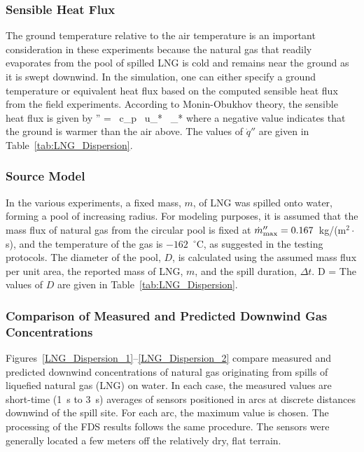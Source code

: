 \subsubsection{Sensible Heat Flux}

The ground temperature relative to the air temperature is an important consideration in these experiments because the natural gas that readily evaporates from the pool of spilled LNG is cold and remains near the ground as it is swept downwind. In the simulation, one can either specify a ground temperature or equivalent heat flux based on the computed sensible heat flux from the field experiments. According to Monin-Obukhov theory, the sensible heat flux is given by
\be
   '' = \rho \, c_p \, u_* \, \theta_*
\ee
where a negative value indicates that the ground is warmer than the air above. The values of $\dot{q}''$ are given in Table~\ref{tab:LNG_Dispersion}.

\subsubsection{Source Model}

In the various experiments, a fixed mass, $m$, of LNG was spilled onto water, forming a pool of increasing radius. For modeling purposes, it is assumed that the mass flux of natural gas from the circular pool is fixed at $\dot{m}''_{\rm max}=0.167$~kg/(m$^2 \cdot$s), and the temperature of the gas is $-162$~$^\circ$C, as suggested in the testing protocols. The diameter of the pool, $D$, is calculated using the assumed mass flux per unit area, the reported mass of LNG, $m$, and the spill duration, $\Delta t$.
\be
   D = 
\ee
The values of $D$ are given in Table~\ref{tab:LNG_Dispersion}.



\subsubsection{Comparison of Measured and Predicted Downwind Gas Concentrations}

Figures~\ref{LNG_Dispersion_1}--\ref{LNG_Dispersion_2} compare measured and predicted downwind concentrations of natural gas originating from spills of liquefied natural gas (LNG) on water. In each case, the measured values are short-time (1~s to 3~s) averages of sensors positioned in arcs at discrete distances downwind of the spill site. For each arc, the maximum value is chosen. The processing of the FDS results follows the same procedure. The sensors were generally located a few meters off the relatively dry, flat terrain.


